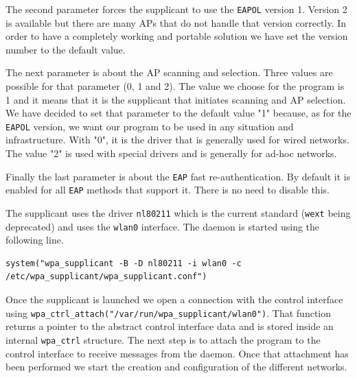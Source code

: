 The second parameter forces the supplicant to use the \texttt{EAPOL} version 1. Version 2 is available but there are many APs that do not handle that version correctly. In order to have a completely working and portable solution we have set the version number to the default value.

The next parameter is about the AP scanning and selection. Three values are possible for that parameter (0, 1 and 2). The value we choose for the program is 1 and it means that it is the supplicant that initiates scanning and AP selection. We have decided to set that parameter to the default value "1" because, as for the \texttt{EAPOL} version, we want our program to be used in any situation and infrastructure. With "0", it is the driver that is generally used for wired networks. The value "2" is used with special drivers and is generally for ad-hoc networks.

Finally the last parameter is about the \texttt{EAP} fast re-authentication. By default it is enabled for all \texttt{EAP} methods that support it. There is no need to disable this.


The supplicant uses the driver \texttt{nl80211} which is the current standard (\texttt{wext} being deprecated) and uses the \texttt{wlan0} interface. The daemon is started using the following line.\\

\begin{lstlisting}[frame=single,breaklines=true,caption={Starting the \texttt{wpa\_supplicant} daemon}]
system("wpa_supplicant -B -D nl80211 -i wlan0 -c /etc/wpa_supplicant/wpa_supplicant.conf")
\end{lstlisting}

Once the supplicant is launched we open a connection with the control interface using \texttt{wpa\_ctrl\_attach("/var/run/wpa\_supplicant/wlan0")}. That function returns a pointer to the abstract control interface data and is stored inside an internal \texttt{wpa\_ctrl} structure. The next step is to attach the program to the control interface to receive messages from the daemon. Once that attachment has been performed we start the creation and configuration of the different networks.

